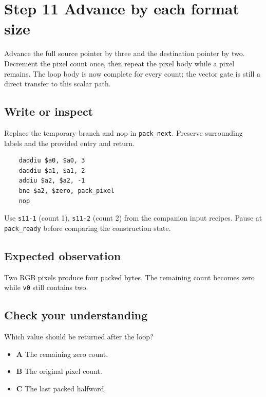 \section{Step 11 Advance by each format size}\label{rgb-s11}

Advance the full source pointer by three and the destination pointer by two. Decrement the pixel count once, then repeat the pixel body while a pixel remains. The loop body is now complete for every count; the vector gate is still a direct transfer to this scalar path.

\subsection{Write or inspect}
Replace the temporary branch and nop in \texttt{pack\_next}. Preserve surrounding labels and the provided entry and return.

\begin{verbatim}
    daddiu $a0, $a0, 3
    daddiu $a1, $a1, 2
    addiu $a2, $a2, -1
    bne $a2, $zero, pack_pixel
    nop
\end{verbatim}
Use \texttt{s11-1} (count 1), \texttt{s11-2} (count 2) from the companion input recipes. Pause at \texttt{pack\_ready} before comparing the construction state.

\subsection{Expected observation}
Two RGB pixels produce four packed bytes. The remaining count becomes zero while \texttt{v0} still contains two.

\subsection{Check your understanding}
Which value should be returned after the loop?

\begin{itemize}
  \item \textbf{A} The remaining zero count.
  \item \textbf{B} The original pixel count.
  \item \textbf{C} The last packed halfword.
\end{itemize}
